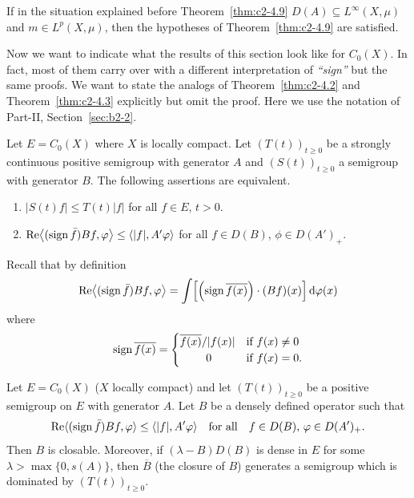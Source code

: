 \begin{example}\label{ex:c2-4.11}
If in the situation explained before Theorem~\ref{thm:c2-4.9}  
$D(A) \subseteq L^{\infty}(X,\mu)$ and $m \in L^{p}(X,\mu)$, then the hypotheses of Theorem~\ref{thm:c2-4.9}   are satisfied.
\end{example}
Now we want to indicate what the results of this section look like for $C_{0}(X)$.
In fact, most of them carry over with a different interpretation of \emph{``sign''} but the same proofs.
We want to state the analogs of Theorem~\ref{thm:c2-4.2}   and Theorem~\ref{thm:c2-4.3}   explicitly but omit the proof.
Here we use the notation of Part-II, Section~\ref{sec:b2-2}.
\begin{theorem}\label{thm:c2-4.12}
Let $E = C_{0}(X)$ where $X$ is locally compact.
Let $(T(t))_{t \geq 0}$ be a strongly continuous positive semigroup with
generator $A$ and $(S(t))_{t \geq 0}$ a semigroup with generator $B$.
The following assertions are equivalent.
\begin{enumerate}[\upshape (a)]
\item \label{thm:c2-4.12-1}
$|S(t)f| \leq T(t)|f|$ for all $f \in E$, $t > 0$.
\item \label{thm:c2-4.12-2}
$\Re\mleft\langle(\sign  \bar{f})Bf,\phi\mright\rangle \leq \langle|f|,A'\phi\rangle$ for all $f \in D(B)$, $\phi \in D(A')_{+}$.
\end{enumerate}
\end{theorem}
Recall that by definition
\[
\Re\mleft\langle(\sign  \bar{f})Bf,\phi\mright\rangle = \int \mleft[\mleft(\sign \overline{f(x)}\mright)\cdot(Bf)(x)\mright] \diff{\phi(x)}
\]
where 
\[\operatorname{sign}  \overline{f(x)} =
\begin{cases}
    \overline{f(x)}/|f(x)| & \text{if } f(x) \neq 0 \\
    \ \quad\quad0  & \text{if } f(x) = 0 .
\end{cases}
\]
\begin{theorem}\label{thm:c2-4.13}
Let $E = C_{0}(X)$ ($X$ locally compact) and let $(T(t))_{t \geq 0}$
be a positive semigroup on $E$ with generator $A$.
Let $B$ be a densely defined operator such that
\begin{equation}\label{eq:c2-4.12}
\Re  \langle(\sign  \bar{f})Bf,\phi\rangle \leq \langle|f|,A'\phi\rangle \quad 
\text{for all} \quad f \in D(B),\, \phi \in D(A')_{+}.
\end{equation}
Then $B$ is closable.
Moreover, if\/ $(\lambda - B)D(B)$ is dense in $E$ for some $\lambda > \max\{0,s(A)\}$, then $\overline{B}$ (the closure of\/ $B$) generates a
semigroup which is dominated by $(T(t))_{t \geq 0}$.
\end{theorem}
